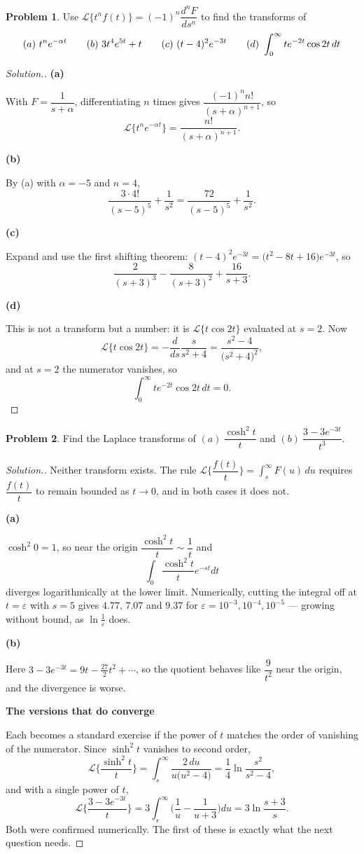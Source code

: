 \documentclass[11pt,a4paper]{article}
\theoremstyle{definition}
\newtheorem{problemx}{Problem}[subsection]
\newenvironment{problem}{\begin{problemx}}{\end{problemx}}
\newenvironment{solution}
  {\renewcommand{\qedsymbol}{}\begin{proof}[\textit{Solution}.]}
  {\end{proof}}
\newcommand{\subhead}[1]{%
  \par\medskip\noindent\textbf{#1}\par\nobreak\smallskip}
\begin{document}
\begin{problem}
Use $\mathcal{L}\{t^nf(t)\} = (-1)^n\dfrac{d^nF}{ds^n}$ to find the transforms
of
$$(a)\ t^ne^{-\alpha t}\hspace{0.7cm}(b)\ 3t^4e^{5t}+t\hspace{0.7cm}
(c)\ (t-4)^2e^{-3t}\hspace{0.7cm}
(d)\ \int_0^{\infty}te^{-2t}\cos 2t\,dt$$
\end{problem}
\begin{solution}
\subhead{(a)}
With $F = \dfrac{1}{s+\alpha}$, differentiating $n$ times gives
$\dfrac{(-1)^nn!}{(s+\alpha)^{n+1}}$, so
$$\mathcal{L}\big\{t^ne^{-\alpha t}\big\} = \frac{n!}{(s+\alpha)^{n+1}}.$$

\subhead{(b)}
By (a) with $\alpha = -5$ and $n=4$,
$$\frac{3\cdot 4!}{(s-5)^5} + \frac{1}{s^2}
= \frac{72}{(s-5)^5} + \frac{1}{s^2}.$$

\subhead{(c)}
Expand and use the first shifting theorem:
$(t-4)^2e^{-3t} = \big(t^2-8t+16\big)e^{-3t}$, so
$$\frac{2}{(s+3)^3} - \frac{8}{(s+3)^2} + \frac{16}{s+3}.$$

\subhead{(d)}
This is not a transform but a number: it is
$\mathcal{L}\{t\cos 2t\}$ evaluated at $s=2$. Now
$$\mathcal{L}\{t\cos 2t\} = -\frac{d}{ds}\frac{s}{s^2+4}
= \frac{s^2-4}{\big(s^2+4\big)^2},$$
and at $s=2$ the numerator vanishes, so
$$\int_0^{\infty}te^{-2t}\cos 2t\,dt = 0 .$$
\end{solution}

\begin{problem}
Find the Laplace transforms of
$(a)\ \dfrac{\cosh^2t}{t}$ and $(b)\ \dfrac{3-3e^{-3t}}{t^3}$.
\end{problem}
\begin{solution}
Neither transform exists. The rule
$\mathcal{L}\Big\{\dfrac{f(t)}{t}\Big\} = \int_s^{\infty}F(u)\,du$ requires
$\dfrac{f(t)}{t}$ to remain bounded as $t\rightarrow 0$, and in both cases it
does not.

\subhead{(a)}
$\cosh^2 0 = 1$, so near the origin $\dfrac{\cosh^2t}{t}\sim\dfrac1t$ and
$$\int_0 \frac{\cosh^2t}{t}e^{-st}dt$$
diverges logarithmically at the lower limit. Numerically, cutting the integral
off at $t=\varepsilon$ with $s=5$ gives $4.77$, $7.07$ and $9.37$ for
$\varepsilon = 10^{-3}, 10^{-4}, 10^{-5}$ --- growing without bound, as
$\ln\frac1\varepsilon$ does.

\subhead{(b)}
Here $3-3e^{-3t} = 9t - \frac{27}{2}t^2+\cdots$, so the quotient behaves like
$\dfrac{9}{t^2}$ near the origin, and the divergence is worse.

\subhead{The versions that do converge}
Each becomes a standard exercise if the power of $t$ matches the order of
vanishing of the numerator. Since $\sinh^2 t$ vanishes to second order,
$$\mathcal{L}\Big\{\frac{\sinh^2t}{t}\Big\}
= \int_s^{\infty}\frac{2\,du}{u\big(u^2-4\big)}
= \frac14\ln\frac{s^2}{s^2-4},$$
and with a single power of $t$,
$$\mathcal{L}\Big\{\frac{3-3e^{-3t}}{t}\Big\}
= 3\int_s^{\infty}\Big(\frac1u-\frac{1}{u+3}\Big)du
= 3\ln\frac{s+3}{s}.$$
Both were confirmed numerically. The first of these is exactly what the next
question needs.
\end{solution}
\end{document}
